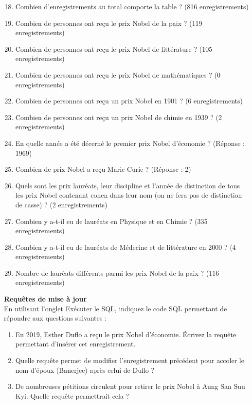 \documentclass[10pt,firamath,cours]{nsi}
\begin{document}
\begin{exercice}
    \begin{enumerate}
    \setcounter{enumi}{17}
    \item  Combien d'enregistrements au total comporte la table ? (816 enregistrements)
    \item  Combien de personnes ont reçu le prix Nobel de la paix ? (119 enregistrements)
    \item  Combien de personnes ont reçu le prix Nobel de littérature ? (105 enregistrements)
    \item  Combien de personnes ont reçu le prix Nobel de mathématiques ? (0 enregistrements)
    \item  Combien de personnes ont reçu un prix Nobel en 1901 ? (6 enregistrements)
    \item  Combien de personnes ont reçu un prix Nobel de chimie en 1939 ? (2 enregistrements)
    \item  En quelle année a été décerné le premier prix Nobel d'économie ? (Réponse : 1969)
    \item  Combien de prix Nobel a reçu Marie Curie ? (Réponse : 2)
    \item  Quels sont les prix lauréats, leur discipline et l'année de distinction de tous les prix Nobel contenant cohen dans leur nom (on ne fera pas de distinction de casse) ? (2 enregistrements)
    \item  Combien y a-t-il eu de lauréats en Physique et en Chimie ? (335 enregistrements)
    \item  Combien y a-t-il eu de lauréats de Médecine et de littérature en 2000 ? (4 enregistrements)
    \item  Nombre de lauréats différents parmi les prix Nobel de la paix ? (116 enregistrements)\\
    \end{enumerate}
    
    \textbf{Requêtes de mise à jour}\\
    \setcounter{enumi}{29}
    En utilisant l'onglet Exécuter le SQL, indiquez le code SQL permettant de répondre aux questions suivantes :\\
    
    \begin{enumerate}
    \item En 2019, Esther Duflo a reçu le prix Nobel d'économie. Écrivez la requête permettant d'insérer cet enregistrement.
    \item  Quelle requête permet de modifier l'enregistrement précédent pour accoler le nom d'époux (Banerjee) après celui de Duflo ?
    \item   De nombreuses pétitions circulent pour retirer le prix Nobel à Aung San Suu Kyi. Quelle requête permettrait cela ?
    \end{enumerate}
    \end{exercice}
    
\end{document}

